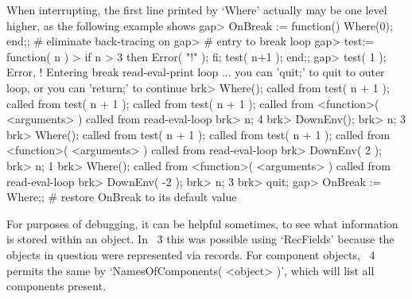 When interrupting, the first line printed by `Where' actually may be
one level higher, as the following example shows
\begintt
gap> OnBreak := function() Where(0); end;; # eliminate back-tracing on
gap>                                       # entry to break loop
gap> test:= function( n )
>    if n > 3 then Error( "!\n" ); fi; test( n+1 ); end;;
gap> test( 1 );
Error, !
Entering break read-eval-print loop ...
you can 'quit;' to quit to outer loop, or
you can 'return;' to continue
brk> Where();
 called from
test( n + 1 ); called from
test( n + 1 ); called from
test( n + 1 ); called from
<function>( <arguments> ) called from read-eval-loop
brk> n;
4
brk> DownEnv();
brk> n;
3
brk> Where();  
 called from
test( n + 1 ); called from
test( n + 1 ); called from
<function>( <arguments> ) called from read-eval-loop
brk> DownEnv( 2 );
brk> n;
1
brk> Where();     
 called from
<function>( <arguments> ) called from read-eval-loop
brk> DownEnv( -2 );
brk> n;
3
brk> quit;
gap> OnBreak := Where;; # restore OnBreak to its default value
\endtt

For purposes of debugging, it can be helpful sometimes, to see what
information is stored within an object. In {\GAP}~3 this was possible using
`RecFields' because the objects in question were represented via records.
For component objects, {\GAP}~4 permits the same by
`NamesOfComponents( <object> )', which will list all components present.


